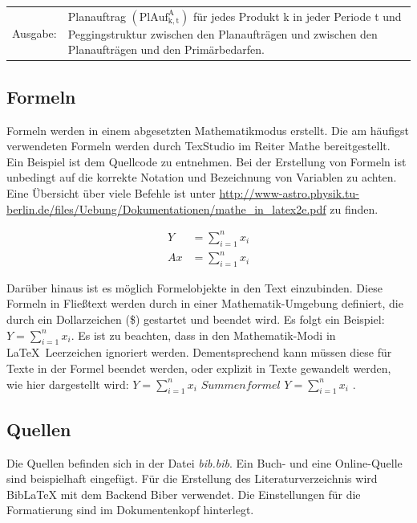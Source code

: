 \begin{algorithmic}
    
    
    \begin{tabularx}{\linewidth}{p{1.5 cm}X}
        Ausgabe: &  Planauftrag $(\mathrm{PlAuf^{A}_{k,t}})$ für jedes Produkt k in jeder Periode t und Peggingstruktur zwischen den Planaufträgen und zwischen den Planaufträgen und den Primärbedarfen.	
    \end{tabularx} 
    \addtocounter{table}{-1} %
\end{algorithmic}


		\subsection{Formeln}
		\label{ch:Formeln}
		Formeln werden in einem abgesetzten Mathematikmodus erstellt. Die am häufigst verwendeten Formeln werden durch TexStudio im Reiter Mathe bereitgestellt. Ein Beispiel ist dem Quellcode zu entnehmen. Bei der Erstellung von Formeln ist unbedingt auf die korrekte Notation und Bezeichnung von Variablen zu achten. Eine Übersicht über viele Befehle ist unter \url{http://www-astro.physik.tu-berlin.de/files/Uebung/Dokumentationen/mathe_in_latex2e.pdf} zu finden.

		\begin{fleqn}[1.25cm]
			\begin{align*}
			Y &= \sum_{i=1}^{n} x_{i} \\
			Ax &= \sum_{i=1}^{n} x_{i}
			\end{align*}
		\end{fleqn}

		Darüber hinaus ist es möglich Formelobjekte in den Text einzubinden. Diese Formeln in Fließtext werden durch in einer Mathematik-Umgebung definiert, die durch ein Dollarzeichen (\$) gestartet und beendet wird. Es folgt ein Beispiel: $Y = \sum_{i=1}^{n} x_{i}$. Es ist zu beachten, dass in den Mathematik-Modi in \LaTeX \ Leerzeichen ignoriert werden. Dementsprechend kann müssen diese für Texte in der Formel beendet werden, oder explizit in Texte gewandelt werden, wie hier dargestellt wird: $Y = \sum_{i=1}^{n} x_{i} \textit{ Summenformel } Y = \sum_{i=1}^{n} x_{i}$ .


		\subsection{Quellen}
		\label{ch:quellen}
		Die Quellen befinden sich in der Datei \textit{bib.bib}. Ein Buch- und eine Online-Quelle sind beispielhaft eingefügt. Für die Erstellung des Literaturverzeichnis wird BibLaTeX mit dem Backend Biber verwendet. Die Einstellungen für die Formatierung sind im Dokumentenkopf hinterlegt.

